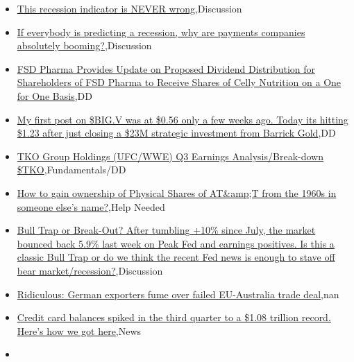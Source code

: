 \documentclass{article}%
\begin{document}
%
\begin{itemize}%
\item%
\href{https://reddit.com/r/wallstreetbets/comments/17qg254/this\_recession\_indicator\_is\_never\_wrong/}{This recession indicator is NEVER wrong},Discussion%
\item%
\href{https://reddit.com/r/wallstreetbets/comments/17qezub/if\_everybody\_is\_predicting\_a\_recession\_why\_are/}{If everybody is predicting a recession, why are payments companies absolutely booming?},Discussion%
\item%
\href{https://reddit.com/r/Baystreetbets/comments/17q14rx/fsd\_pharma\_provides\_update\_on\_proposed\_dividend/}{FSD Pharma Provides Update on Proposed Dividend Distribution for Shareholders of FSD Pharma to Receive Shares of Celly Nutrition on a One for One Basis},DD%
\item%
\href{https://reddit.com/r/Baystreetbets/comments/17pyv2r/my\_first\_post\_on\_bigv\_was\_at\_056\_only\_a\_few\_weeks/}{My first post on \$BIG.V was at \$0.56 only a few weeks ago. Today its hitting \$1.23 after just closing a \$23M strategic investment from Barrick Gold},DD%
\item%
\href{https://reddit.com/r/StockMarket/comments/17qf7c3/tko\_group\_holdings\_ufcwwe\_q3\_earnings/}{TKO Group Holdings (UFC/WWE) Q3 Earnings Analysis/Break-down \$TKO},Fundamentals/DD%
\item%
\href{https://reddit.com/r/StockMarket/comments/17pvfun/how\_to\_gain\_ownership\_of\_physical\_shares\_of\_att/}{How to gain ownership of Physical Shares of AT\&amp;T from the 1960s in someone else's name?},Help Needed%
\item%
\href{https://reddit.com/r/StockMarket/comments/17pv9aq/bull\_trap\_or\_breakout\_after\_tumbling\_10\_since/}{Bull Trap or Break-Out? After tumbling +10\% since July, the market bounced back 5.9\% last week on Peak Fed and earnings positives. Is this a classic Bull Trap or do we think the recent Fed news is enough to stave off bear market/recession?},Discussion%
\item%
\href{https://reddit.com/r/Economics/comments/17q5vq8/ridiculous\_german\_exporters\_fume\_over\_failed/}{Ridiculous: German exporters fume over failed EU-Australia trade deal},nan%
\item%
\href{https://reddit.com/r/Economics/comments/17q4tig/credit\_card\_balances\_spiked\_in\_the\_third\_quarter/}{Credit card balances spiked in the third quarter to a \$1.08 trillion record. Here's how we got here},News%
\item%

\end{itemize}
\end{document}
